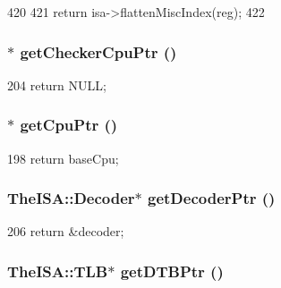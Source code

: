 \begin{DoxyCode}
420     {
421         return isa->flattenMiscIndex(reg);
422     }
\end{DoxyCode}
\hypertarget{classSimpleThread_a0807ebbe39e158fdf6007ca00e3f7252}{
\subsubsection[{getCheckerCpuPtr}]{$\ast$ getCheckerCpuPtr ()}}
\label{classSimpleThread_a0807ebbe39e158fdf6007ca00e3f7252}



\begin{DoxyCode}
204 { return NULL; }
\end{DoxyCode}
\hypertarget{classSimpleThread_a4f35ce7d5cb2ec57504bc2c2bc03c879}{
\subsubsection[{getCpuPtr}]{$\ast$ getCpuPtr ()}}
\label{classSimpleThread_a4f35ce7d5cb2ec57504bc2c2bc03c879}



\begin{DoxyCode}
198 { return baseCpu; }
\end{DoxyCode}
\hypertarget{classSimpleThread_a6ae33963bc5f8b515f0a50c483f21c7f}{
\subsubsection[{getDecoderPtr}]{\setlength{\rightskip}{0pt plus 5cm}TheISA::Decoder$\ast$ getDecoderPtr ()}}
\label{classSimpleThread_a6ae33963bc5f8b515f0a50c483f21c7f}



\begin{DoxyCode}
206 { return &decoder; }
\end{DoxyCode}
\hypertarget{classSimpleThread_a2fe6a07c44bc2a4d83b86bea605ba971}{
\subsubsection[{getDTBPtr}]{\setlength{\rightskip}{0pt plus 5cm}TheISA::TLB$\ast$ getDTBPtr ()}}
\label{classSimpleThread_a2fe6a07c44bc2a4d83b86bea605ba971}



